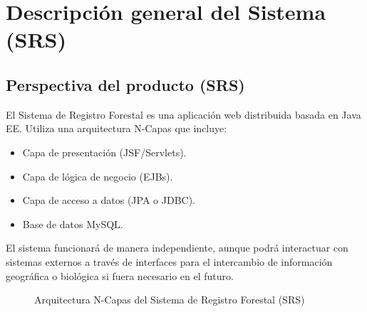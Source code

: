 \section{Descripción general del Sistema (SRS)}
\label{srs:descripcion}

\subsection{Perspectiva del producto (SRS)}
\label{srs:perspectiva}
El Sistema de Registro Forestal es una aplicación web distribuida basada en Java EE. Utiliza una arquitectura N-Capas que incluye:
\begin{itemize}
\item Capa de presentación (JSF/Servlets).
\item Capa de lógica de negocio (EJBs).
\item Capa de acceso a datos (JPA o JDBC).
\item Base de datos MySQL.
\end{itemize}
El sistema funcionará de manera independiente, aunque podrá interactuar con sistemas externos a través de interfaces para el intercambio de información geográfica o biológica si fuera necesario en el futuro.

\begin{figure}[h]
\centering
{}
\caption{Arquitectura N-Capas del Sistema de Registro Forestal (SRS)}
\label{fig:srs_arquitectura}
\end{figure}

